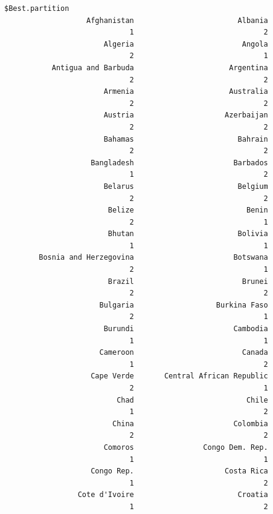 \documentclass[
]{article}
\begin{document}
\begin{verbatim}
$Best.partition
                   Afghanistan                        Albania 
                             1                              2 
                       Algeria                         Angola 
                             2                              1 
           Antigua and Barbuda                      Argentina 
                             2                              2 
                       Armenia                      Australia 
                             2                              2 
                       Austria                     Azerbaijan 
                             2                              2 
                       Bahamas                        Bahrain 
                             2                              2 
                    Bangladesh                       Barbados 
                             1                              2 
                       Belarus                        Belgium 
                             2                              2 
                        Belize                          Benin 
                             2                              1 
                        Bhutan                        Bolivia 
                             1                              1 
        Bosnia and Herzegovina                       Botswana 
                             2                              1 
                        Brazil                         Brunei 
                             2                              2 
                      Bulgaria                   Burkina Faso 
                             2                              1 
                       Burundi                       Cambodia 
                             1                              1 
                      Cameroon                         Canada 
                             1                              2 
                    Cape Verde       Central African Republic 
                             2                              1 
                          Chad                          Chile 
                             1                              2 
                         China                       Colombia 
                             2                              2 
                       Comoros                Congo Dem. Rep. 
                             1                              1 
                    Congo Rep.                     Costa Rica 
                             1                              2 
                 Cote d'Ivoire                        Croatia 
                             1                              2 

\end{verbatim}
\end{document}
